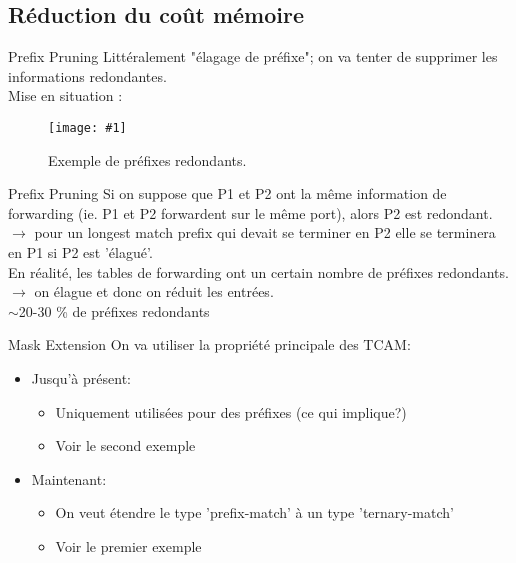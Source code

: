 \documentclass{beamer}
\newcommand{\imageR}[2]{\texttt{[image: \#1]}}
\begin{document}
\subsection{Réduction du coût mémoire}
\begin{frame}{Prefix Pruning}
Littéralement "élagage de préfixe"; on va tenter de supprimer les informations redondantes. \\
Mise en situation : 
\begin{figure}
	\begin{center}
	\imageR{prunning_ex.png}{150}
	\caption{Exemple de préfixes redondants.}
	\end{center}	
\end{figure}
\end{frame} 
\begin{frame}{Prefix Pruning}
Si on suppose que P1 et P2 ont la même information de forwarding (ie. P1 et P2 forwardent sur le même port), 
alors P2 est redondant. \\
$\rightarrow$ pour un longest match prefix qui devait se terminer en P2 elle se terminera en P1 si 
P2 est 'élagué'. \\
En réalité, les tables de forwarding ont un certain nombre de préfixes redondants. \\
$\rightarrow$ on élague et donc on réduit les entrées. \\

$\sim$20-30 \% de préfixes redondants
\end{frame}

\begin{frame}{Mask Extension}
On va utiliser la propriété principale des TCAM: 
\begin{itemize} 
\item Jusqu'à présent: 
\begin{itemize}
\item Uniquement utilisées pour des préfixes (ce qui implique?)
\item Voir le second exemple 
\end{itemize}
\pause \item Maintenant:
\begin{itemize}
\item On veut étendre le type 'prefix-match' à un type 'ternary-match'
\item Voir le premier exemple
\end{itemize}
\end{itemize}
\end{frame}
\end{document}
